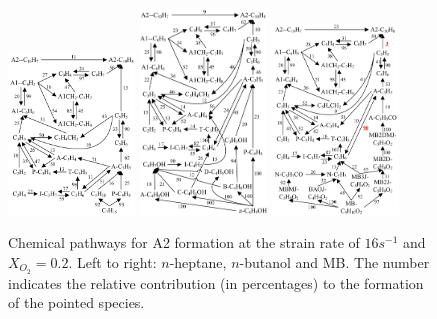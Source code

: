 \documentclass[preprint,3p,times,twocolumn]{elsarticleUS}
\begin{document}
\begin{figure}[ht]
  \centering
  \scriptsize
  \includegraphics[width=0.3\textwidth]{Pathways-Hep.png}
  \includegraphics[width=0.3\textwidth]{Pathways-NB.png}
  \includegraphics[width=0.3\textwidth]{Pathways-MB.png}
  \normalsize
  \caption{Chemical pathways for A2 formation at the strain rate of $16 s^{-1}$ and $X_{O_2}=0.2$. Left to right: $n$-heptane, $n$-butanol and MB. The number indicates the relative contribution (in percentages) to the formation of the pointed species.}
  \label{fig:Pathways}
\end{figure}
\end{document}
